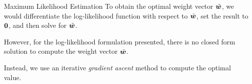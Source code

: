 \begin{frame}{Maximum Likelihood Estimation}
To obtain the optimal weight vector $\tilde{{\boldsymbol w}}$,
we would differentiate the log-likelihood function
with respect to $\tilde{{\boldsymbol w}}$, set the
result to $\mathbf{0}$, and then solve for $\tilde{{\boldsymbol w}}$.

\medskip

However, for the log-likelihood formulation presented,%
there is no closed form solution to
compute the weight vector $\tilde{{\boldsymbol w}}$.

\medskip

Instead, we use an iterative {\em gradient ascent} method to
compute the optimal value.


\medskip


\end{frame}
